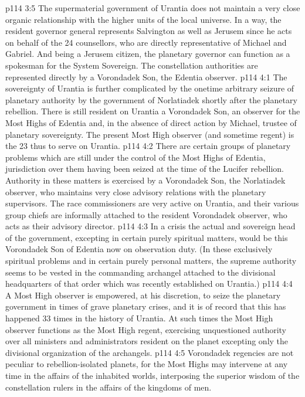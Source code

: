 \vs p114 3:5 The supermaterial government of Urantia does not maintain a very close organic relationship with the higher units of the local universe. In a way, the resident governor general represents Salvington as well as Jerusem since he acts on behalf of the 24 counsellors, who are directly representative of Michael and Gabriel. And being a Jerusem citizen, the planetary governor can function as a spokesman for the System Sovereign. The constellation authorities are represented directly by a Vorondadek Son, the Edentia observer.
\vs p114 4:1 The sovereignty of Urantia is further complicated by the onetime arbitrary seizure of planetary authority by the government of Norlatiadek shortly after the planetary rebellion. There is still resident on Urantia a Vorondadek Son, an observer for the Most Highs of Edentia and, in the absence of direct action by Michael, trustee of planetary sovereignty. The present Most High observer (and sometime regent) is the 23 thus to serve on Urantia.
\vs p114 4:2 There are certain groups of planetary problems which are still under the control of the Most Highs of Edentia, jurisdiction over them having been seized at the time of the Lucifer rebellion. Authority in these matters is exercised by a Vorondadek Son, the Norlatiadek observer, who maintains very close advisory relations with the planetary supervisors. The race commissioners are very active on Urantia, and their various group chiefs are informally attached to the resident Vorondadek observer, who acts as their advisory director.
\vs p114 4:3 In a crisis the actual and sovereign head of the government, excepting in certain purely spiritual matters, would be this Vorondadek Son of Edentia now on observation duty. (In these exclusively spiritual problems and in certain purely personal matters, the supreme authority seems to be vested in the commanding archangel attached to the divisional headquarters of that order which was recently established on Urantia.)
\vs p114 4:4 \pc A Most High observer is empowered, at his discretion, to seize the planetary government in times of grave planetary crises, and it is of record that this has happened 33 times in the history of Urantia. At such times the Most High observer functions as the Most High regent, exercising unquestioned authority over all ministers and administrators resident on the planet excepting only the divisional organization of the archangels.
\vs p114 4:5 Vorondadek regencies are not peculiar to rebellion\hyp{}isolated planets, for the Most Highs may intervene at any time in the affairs of the inhabited worlds, interposing the superior wisdom of the constellation rulers in the affairs of the kingdoms of men.
